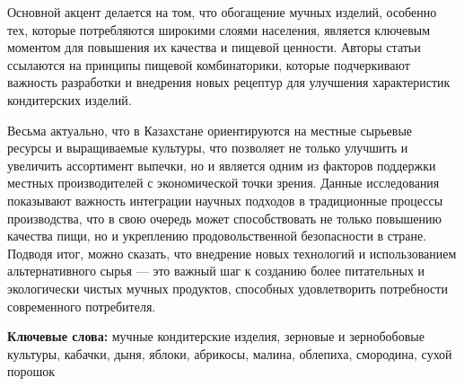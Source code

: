 Основной акцент делается на том, что обогащение мучных изделий, особенно
тех, которые потребляются широкими слоями населения, является ключевым
моментом для повышения их качества и пищевой ценности. Авторы статьи
ссылаются на принципы пищевой комбинаторики, которые подчеркивают
важность разработки и внедрения новых рецептур для улучшения
характеристик кондитерских изделий.

Весьма актуально, что в Казахстане ориентируются на местные сырьевые
ресурсы и выращиваемые культуры, что позволяет не только улучшить и
увеличить ассортимент выпечки, но и является одним из факторов поддержки
местных производителей с экономической точки зрения. Данные исследования
показывают важность интеграции научных подходов в традиционные процессы
производства, что в свою очередь может способствовать не только
повышению качества пищи, но и укреплению продовольственной безопасности
в стране. Подводя итог, можно сказать, что внедрение новых технологий и
использованием альтернативного сырья --- это важный шаг к созданию более
питательных и экологически чистых мучных продуктов, способных
удовлетворить потребности современного потребителя.

{\bfseries Ключевые слова:} мучные кондитерские изделия, зерновые и
зернобобовые культуры, кабачки, дыня, яблоки, абрикосы, малина,
облепиха, смородина, сухой порошок

